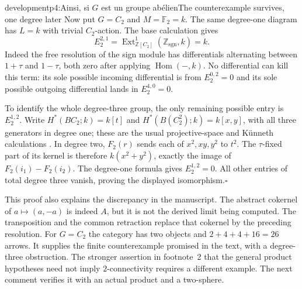 \begin{dcomment}{development}{p4:Ainsi, si $G$ est un groupe abélien}{The counterexample survives, one degree later}
Now put $G=C_2$ and $M=\mathbb F_2=k$. The same degree-one diagram has $L=k$ with trivial $C_2$-action. The base calculation gives
\[
 E_2^{2,1}=\operatorname{Ext}^1_{\mathbb Z[C_2]}(\mathbb Z_{\mathrm{sgn}},k)=k.
\]
Indeed the free resolution of the sign module has differentials alternating between $1+\tau$ and $1-\tau$, both zero after applying $\operatorname{Hom}(-,k)$. No differential can kill this term: its sole possible incoming differential is from $E_2^{0,2}=0$ and its sole possible outgoing differential lands in $E_2^{4,0}=0$.

To identify the whole degree-three group, the only remaining possible entry is $E_2^{1,2}$. Write $H^*(BC_2;k)=k[t]$ and $H^*(B(C_2^2);k)=k[x,y]$, with all three generators in degree one; these are the usual projective-space and K\"unneth calculations \citep[Theorems 3.15 and 3.19]{Hatcher2002}. In degree two, $F_2(r)$ sends each of $x^2,xy,y^2$ to $t^2$. The $\tau$-fixed part of its kernel is therefore $k(x^2+y^2)$, exactly the image of $F_2(i_1)-F_2(i_2)$. The degree-one formula gives $E_2^{1,2}=0$. All other entries of total degree three vanish, proving the displayed isomorphism.\hfill$\square$

This proof also explains the discrepancy in the manuscript. The abstract cokernel of $a\mapsto(a,-a)$ is indeed $A$, but it is not the derived limit being computed. The transposition and the common retraction replace that cokernel by the preceding resolution. For $G=C_2$ the category has two objects and $2+4+4+16=26$ arrows. It supplies the finite counterexample promised in the text, with a degree-three obstruction. The stronger assertion in footnote~2 that the general product hypotheses need not imply $2$-connectivity requires a different example. The next comment verifies it with an actual product and a two-sphere.
\end{dcomment}

